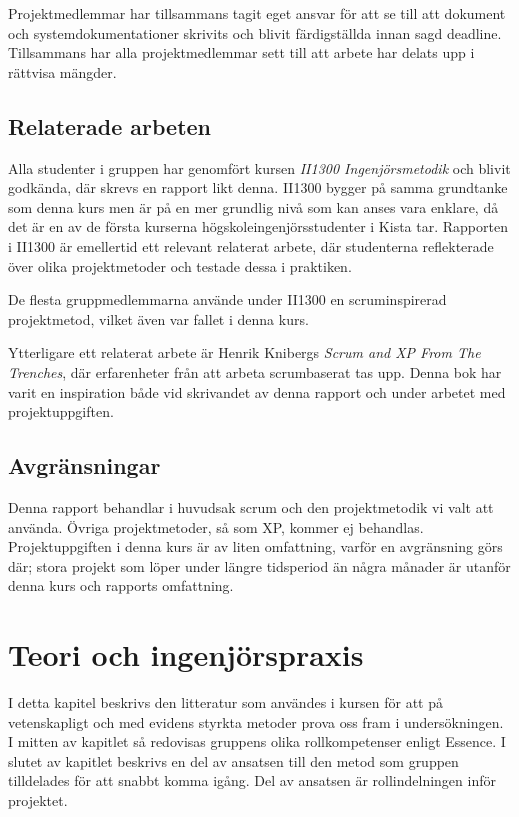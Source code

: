 \documentclass[conference]{IEEEtran}
\begin{document}
Projektmedlemmar har tillsammans tagit eget ansvar för att se till att dokument och systemdokumentationer skrivits och blivit färdigställda innan sagd deadline.
Tillsammans har alla projektmedlemmar sett till att arbete har delats upp i rättvisa mängder.

\subsection{Relaterade arbeten}
Alla studenter i gruppen har genomfört kursen \textit{II1300 Ingenjörsmetodik} och blivit godkända, där skrevs en rapport likt denna. II1300 bygger på samma 
grundtanke som denna kurs men är på en mer grundlig nivå som kan anses vara enklare, då det är en av de första kurserna högskoleingenjörsstudenter i Kista tar. Rapporten i II1300 är emellertid ett relevant relaterat arbete, där studenterna reflekterade över olika projektmetoder och testade dessa i praktiken.

De flesta gruppmedlemmarna använde under II1300 en scruminspirerad projektmetod, vilket även var fallet i denna kurs. 

Ytterligare ett relaterat arbete är Henrik Knibergs \textit{Scrum and XP From The Trenches}\cite{kniberg_scrum_2015}, där erfarenheter från att arbeta scrumbaserat tas upp.
Denna bok har varit en inspiration både vid skrivandet av denna rapport och under arbetet med projektuppgiften.

\subsection{Avgränsningar}
Denna rapport behandlar i huvudsak scrum och den projektmetodik vi valt att använda. Övriga projektmetoder, så som XP, kommer ej behandlas.
Projektuppgiften i denna kurs är av liten omfattning, varför en avgränsning görs där; stora projekt som löper under längre tidsperiod än några månader är utanför denna
kurs och rapports omfattning.

\section{Teori och ingenjörspraxis}
I detta kapitel beskrivs den litteratur som användes i kursen för att på  vetenskapligt och med evidens styrkta metoder prova oss fram i undersökningen. I mitten av kapitlet så redovisas gruppens olika rollkompetenser enligt Essence. I slutet av kapitlet beskrivs en del av ansatsen till den metod som gruppen tilldelades för att snabbt komma igång. Del av ansatsen är rollindelningen inför projektet.
\end{document}
